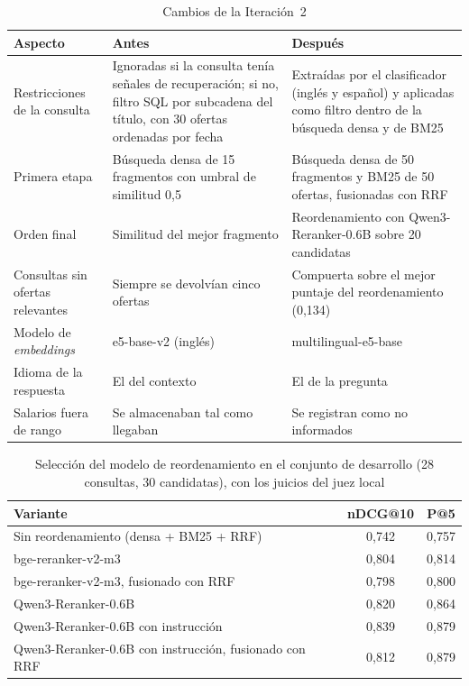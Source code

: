 \begin{table}[htbp!]
    \centering
    \caption{Cambios de la Iteración~2}
    \label{tab:art-cambios}
    \small
    \begin{tabular}{|p{3cm}|p{5.4cm}|p{5.4cm}|}
        \hline
        \textbf{Aspecto} & \textbf{Antes} & \textbf{Después} \\
        \hline
        Restricciones de la consulta & Ignoradas si la consulta tenía señales de recuperación; si no, filtro SQL por subcadena del título, con 30 ofertas ordenadas por fecha & Extraídas por el clasificador (inglés y español) y aplicadas como filtro dentro de la búsqueda densa y de BM25 \\
        \hline
        Primera etapa & Búsqueda densa de 15 fragmentos con umbral de similitud 0,5 & Búsqueda densa de 50 fragmentos y BM25 de 50 ofertas, fusionadas con RRF \\
        \hline
        Orden final & Similitud del mejor fragmento & Reordenamiento con Qwen3-Reranker-0.6B sobre 20 candidatas \\
        \hline
        Consultas sin ofertas relevantes & Siempre se devolvían cinco ofertas & Compuerta sobre el mejor puntaje del reordenamiento (0,134) \\
        \hline
        Modelo de \textit{embeddings} & e5-base-v2 (inglés) & multilingual-e5-base \\
        \hline
        Idioma de la respuesta & El del contexto & El de la pregunta \\
        \hline
        Salarios fuera de rango & Se almacenaban tal como llegaban & Se registran como no informados \\
        \hline
    \end{tabular}
\end{table}

\label{sec:art-rerank}

\begin{table}[!htb]
    \centering
    \caption{Selección del modelo de reordenamiento en el conjunto de desarrollo (28 consultas, 30 candidatas), con los juicios del juez local}
    \label{tab:art-rerank-dev}
    \small
    \begin{tabular}{|l|c|c|}
        \hline
        \textbf{Variante} & \textbf{nDCG@10} & \textbf{P@5} \\
        \hline
        Sin reordenamiento (densa + BM25 + RRF) & 0{,}742 & 0{,}757 \\
        \hline
        bge-reranker-v2-m3 & 0{,}804 & 0{,}814 \\
        \hline
        bge-reranker-v2-m3, fusionado con RRF & 0{,}798 & 0{,}800 \\
        \hline
        Qwen3-Reranker-0.6B & 0{,}820 & 0{,}864 \\
        \hline
        Qwen3-Reranker-0.6B con instrucción & 0{,}839 & 0{,}879 \\
        \hline
        Qwen3-Reranker-0.6B con instrucción, fusionado con RRF & 0{,}812 & 0{,}879 \\
        \hline
    \end{tabular}
\end{table}

